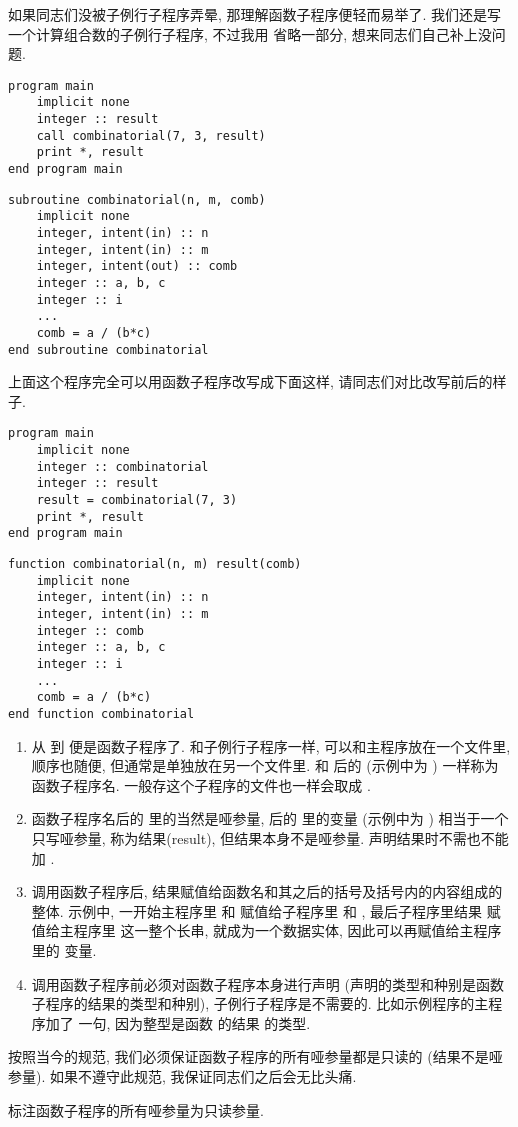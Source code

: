 如果同志们没被子例行子程序弄晕, 那理解函数子程序便轻而易举了. 我们还是写一个计算组合数的子例行子程序, 不过我用  省略一部分, 想来同志们自己补上没问题. 
\begin{lstlisting} 
program main
    implicit none
    integer :: result
    call combinatorial(7, 3, result)
    print *, result
end program main
\end{lstlisting}
\begin{lstlisting}
subroutine combinatorial(n, m, comb)
    implicit none
    integer, intent(in) :: n
    integer, intent(in) :: m
    integer, intent(out) :: comb
    integer :: a, b, c
    integer :: i
    ... 
    comb = a / (b*c)
end subroutine combinatorial
\end{lstlisting} 
上面这个程序完全可以用函数子程序改写成下面这样, 请同志们对比改写前后的样子. 
\begin{lstlisting} 
program main
    implicit none
    integer :: combinatorial
    integer :: result
    result = combinatorial(7, 3)
    print *, result
end program main
\end{lstlisting}
\begin{lstlisting}
function combinatorial(n, m) result(comb)
    implicit none
    integer, intent(in) :: n
    integer, intent(in) :: m
    integer :: comb
    integer :: a, b, c
    integer :: i
    ... 
    comb = a / (b*c)
end function combinatorial
\end{lstlisting} 
\begin{enumerate} 
    \item 从  到  便是函数子程序了. 和子例行子程序一样, 可以和主程序放在一个文件里, 顺序也随便, 但通常是单独放在另一个文件里.   和  后的  (示例中为 ) 一样称为函数子程序名. 一般存这个子程序的文件也一样会取成 . 
    \item 函数子程序名后的 \ttt{()} 里的当然是哑参量, \ttt{()} 后的  里的变量  (示例中为 ) 相当于一个只写哑参量, 称为结果(result), 但结果本身不是哑参量. 声明结果时不需也不能加 . 
    \item 调用函数子程序后, 结果赋值给函数名和其之后的括号及括号内的内容组成的整体. 示例中, 一开始主程序里  和  赋值给子程序里  和 , 最后子程序里结果  赋值给主程序里  这一整个长串,  就成为一个数据实体, 因此可以再赋值给主程序里的  变量. 
    \item 调用函数子程序前必须对函数子程序本身进行声明 (声明的类型和种别是函数子程序的结果的类型和种别), 子例行子程序是不需要的. 比如示例程序的主程序加了  一句, 因为整型是函数  的结果  的类型. 
\end{enumerate} 
按照当今的规范, 我们必须保证函数子程序的所有哑参量都是只读的 (结果不是哑参量). 如果不遵守此规范, 我保证同志们之后会无比头痛. 
\begin{convention}\label{func_all_in}
    标注函数子程序的所有哑参量为只读参量. 
\end{convention} 

